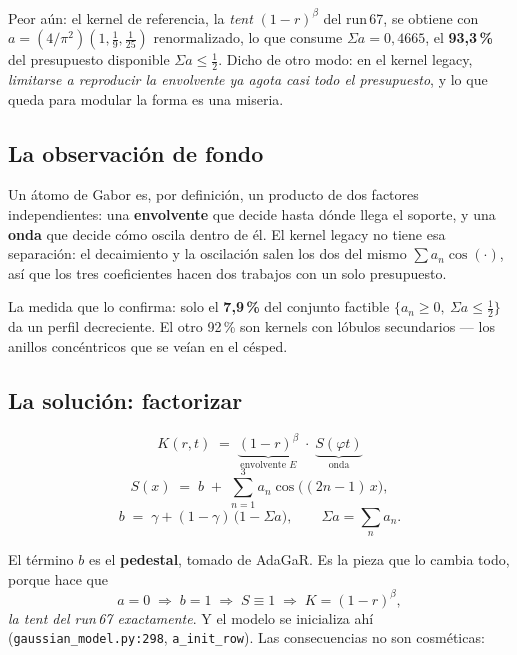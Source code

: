 \documentclass[12pt]{extarticle}
\newcommand{\ssum}{\Sigma a}
\newcommand{\code}[1]{\texttt{#1}}
\begin{document}
Peor aún: el kernel de referencia, la \emph{tent} $(1-r)^\beta$ del run\,67,
se obtiene con $a=(4/\pi^2)(1,\tfrac19,\tfrac1{25})$ renormalizado, lo que
consume $\ssum=0{,}4665$, el \textbf{93{,}3\,\%} del presupuesto disponible
$\ssum\le\frac12$. Dicho de otro modo: en el kernel legacy, \emph{limitarse a
reproducir la envolvente ya agota casi todo el presupuesto}, y lo que queda
para modular la forma es una miseria.

\subsection{La observación de fondo}

Un átomo de Gabor es, por definición, un producto de dos factores
independientes: una \textbf{envolvente} que decide hasta dónde llega el
soporte, y una \textbf{onda} que decide cómo oscila dentro de él. El kernel
legacy no tiene esa separación: el decaimiento y la oscilación salen los dos
del mismo $\sum a_n\cos(\cdot)$, así que los tres coeficientes hacen dos
trabajos con un solo presupuesto.

La medida que lo confirma: solo el \textbf{7{,}9\,\%} del conjunto factible
$\{a_n\ge0,\ \ssum\le\frac12\}$ da un perfil decreciente. El otro 92\,\% son
kernels con lóbulos secundarios --- los anillos concéntricos que se veían en
el césped.

\subsection{La solución: factorizar}

\begin{equation}
\boxed{\;K(r,t) \;=\; \underbrace{(1-r)^{\beta}}_{\text{envolvente }E}
\;\cdot\; \underbrace{S(\varphi t)}_{\text{onda}}\;}
\label{eq:kernel}
\end{equation}
\begin{equation}
S(x) \;=\; b \;+\; \sum_{n=1}^{3} a_n\cos\bigl((2n-1)\,x\bigr),
\label{eq:onda}
\end{equation}
\begin{equation}
b \;=\; \gamma + (1-\gamma)\,\bigl(1-\ssum\bigr),\qquad \ssum=\sum_n a_n .
\label{eq:pedestal}
\end{equation}

El término $b$ es el \textbf{pedestal}, tomado de AdaGaR. Es la pieza que lo
cambia todo, porque hace que
\[
a=0 \;\Longrightarrow\; b=1 \;\Longrightarrow\; S\equiv 1
\;\Longrightarrow\; K=(1-r)^{\beta},
\]
\emph{la tent del run\,67 exactamente}. Y el modelo se inicializa ahí
(\code{gaussian\_model.py:298}, \code{a\_init\_row}). Las consecuencias no son
cosméticas:
\end{document}
